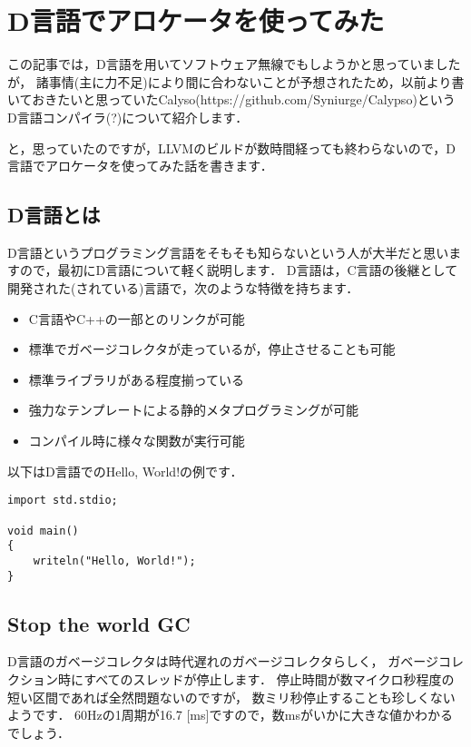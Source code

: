 \chapter{D言語でアロケータを使ってみた}

この記事では，D言語を用いてソフトウェア無線でもしようかと思っていましたが，
諸事情(主に力不足)により間に合わないことが予想されたため，以前より書いておきたいと思っていたCalyso(https://github.com/Syniurge/Calypso)というD言語コンパイラ(?)について紹介します．

と，思っていたのですが，LLVMのビルドが数時間経っても終わらないので，D言語でアロケータを使ってみた話を書きます．

\section{D言語とは}

D言語というプログラミング言語をそもそも知らないという人が大半だと思いますので，最初にD言語について軽く説明します．
D言語は，C言語の後継として開発された(されている)言語で，次のような特徴を持ちます．

\begin{itemize}
\item C言語やC++の一部とのリンクが可能
\item 標準でガベージコレクタが走っているが，停止させることも可能
\item 標準ライブラリがある程度揃っている
\item 強力なテンプレートによる静的メタプログラミングが可能
\item コンパイル時に様々な関数が実行可能
\end{itemize}

以下はD言語でのHello, World!の例です．

\begin{lstlisting}[]
import std.stdio;

void main()
{
    writeln("Hello, World!");
}
\end{lstlisting}


\section{Stop the world GC}

D言語のガベージコレクタは時代遅れのガベージコレクタらしく，
ガベージコレクション時にすべてのスレッドが停止します．
停止時間が数マイクロ秒程度の短い区間であれば全然問題ないのですが，
数ミリ秒停止することも珍しくないようです． 60Hzの1周期が16.7
{[}ms{]}ですので，数msがいかに大きな値かわかるでしょう．


